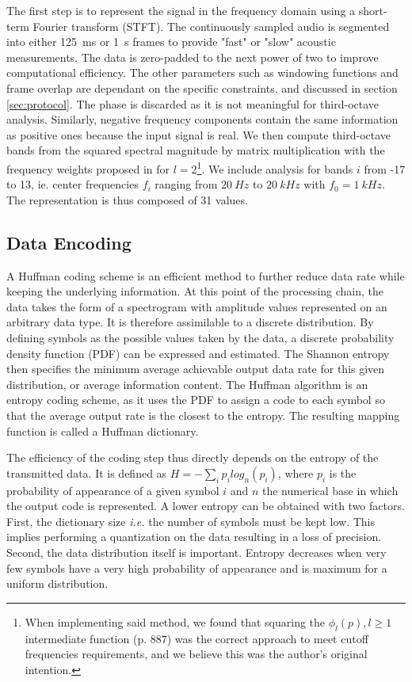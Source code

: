 \documentclass[sensors,article,submit,moreauthors,pdftex,10pt,a4paper]{mdpi}
\begin{document}
The first step is to represent the signal in the frequency domain using a short-term Fourier transform (STFT). The continuously sampled audio is segmented into either 125~ms or 1~s frames to provide "fast" or "slow" acoustic measurements. The data is zero-padded to the next power of two to improve computational efficiency. The other parameters such as windowing functions and frame overlap are dependant on the specific constraints, and discussed in section \ref{sec:protocol}. The phase is discarded as it is not meaningful for third-octave analysis. Similarly, negative frequency components contain the same information as positive ones because the input signal is real. We then compute third-octave bands from the squared spectral magnitude by matrix multiplication with the frequency weights proposed in \cite{antoni2010} for $l = 2$\footnote{When implementing said method, we found that squaring the $\phi_l(p), l \geq 1$ intermediate function (p. 887) was the correct approach to meet cutoff frequencies requirements, and we believe this was the author's original intention.}. We include analysis for bands $i$ from -17 to 13, ie. center frequencies $f_i$ ranging from $20~Hz$ to $20~kHz$ with $f_0 = 1~kHz$. The representation is thus composed of 31 values.


\subsection{Data Encoding}

A Huffman coding scheme \cite{huffman1952} is an efficient method to further reduce data rate while keeping the underlying information. At this point of the processing chain, the data takes the form of a spectrogram with amplitude values represented on an arbitrary data type. It is therefore assimilable to a discrete distribution. By defining symbols as the possible values taken by the data, a discrete probability density function (PDF) can be expressed and estimated. The Shannon entropy then specifies the minimum average achievable output data rate for this given distribution, or average information content. The Huffman algorithm is an entropy coding scheme, as it uses the PDF to assign a code to each symbol so that the average output rate is the closest to the entropy. The resulting mapping function is called a Huffman dictionary.

The efficiency of the coding step thus directly depends on the entropy of the transmitted data. It is defined as $H = -\sum\limits_i p_ilog_n(p_i)$, where $p_i$ is the probability of appearance of a given symbol $i$ and $n$ the numerical base in which the output code is represented. A lower entropy can be obtained with two factors. First, the dictionary size \textit{i.e.} the number of symbols must be kept low. This implies performing a quantization on the data resulting in a loss of precision. Second, the data distribution itself is important. Entropy decreases when very few symbols have a very high probability of appearance and is maximum for a uniform distribution.
\end{document}
